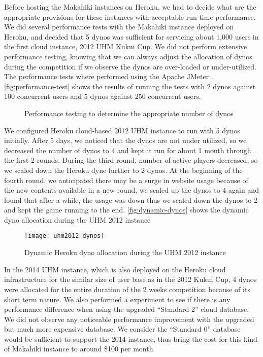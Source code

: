 Before hosting the Makahiki instances on Heroku, we had to decide what are the appropriate provisions for these instances with acceptable run time performance. 
We did several performance tests with the Makahiki instance deployed on Heroku, and decided that 5 dynos was sufficient for servicing about 1,000 users in the first cloud instance, 2012 UHM Kukui Cup. We did not perform extensive performance testing, knowing that we can always adjust the allocation of dynos during the competition if we observe the dynos are over-loaded or under-utilized. The performance tests where performed using the Apache JMeter \cite{jmeter}. \autoref{fig:performance-test} shows the results of running the tests with 2 dynos against 100 concurrent users and 5 dynos against 250 concurrent users.

\begin{figure}[ht!]
	\centering
		\caption{Performance testing to determine the appropriate number of dynos}
		\label{fig:performance-test}
\end{figure}

We configured Heroku cloud-based 2012 UHM instance to run with 5 dynos initially. After 5 days, we noticed that the dynos are not under utilized, so we decreased the number of dynos to 4 and kept it run for about 1 month through the first 2 rounds. During the third round, number of active players decreased, so we scaled down the Heroku dyne further to 2 dynos. At the beginning of the fourth round, we anticipated there may be a surge in website usage because of the new contents available in a new round, we scaled up the dynos to 4 again and found that after a while, the usage was down thus we scaled down the dynos to 2 and kept the game running to the end. \autoref{fig:dynamic-dynos} shows the dynamic dyno allocation during the UHM 2012 instance

\begin{figure}[ht!]
  \center
  \texttt{[image: uhm2012-dynos]}
  \caption{Dynamic Heroku dyno allocation during the UHM 2012 instance}
  \label{fig:dynamic-dynos}
\end{figure}

In the 2014 UHM instance, which is also deployed on the Heroku cloud infrastructure for the similar size of user base as in the 2012 Kukui Cup, 4 dynos were allocated for the entire duration of the 2 weeks competition because of its short term nature. We also performed a experiment to see if there is any performance difference when using the upgraded ``Standard 2'' cloud database. We did not observe any noticeable performance improvement with the upgraded but much more expensive database. We consider the ``Standard 0'' database would be sufficient to support the 2014 instance, thus bring the cost for this kind of Makahiki instance to around \$100 per month.

